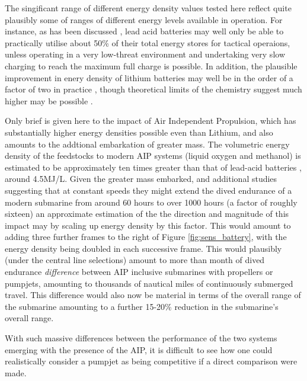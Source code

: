 \documentclass{article}\usepackage[]{graphicx}\usepackage[]{color}
\begin{document}
The singificant range of different energy density values tested here reflect quite plausibly some of ranges of different energy levels available in operation.  For instance, as has been discussed \parencite{briggs2016, greenfield2016}, lead acid batteries may well only be able to practically utilise about 50\% of their total energy stores for tactical operaions, unless operating in a very low-threat environment and undertaking very slow charging to reach the maximum full charge is possible. In addition, the plausible improvement in enery density of lithium batteries may well be in the order of a factor of two in practice \parencite{greenfield2016}, though theoretical limits of the chemistry suggest much higher may be possible \parencite{davies2016}.

Only brief is given here to the impact of Air Independent Propulsion, which has substantially higher energy densities possible even than Lithium, and also amounts to the addtional embarkation of greater mass. The volumetric energy density of the feedstocks to modern AIP systems (liquid oxygen and methanol) is estimated to be approximately ten times greater than that of lead-acid batteries \parencite{davies2016}, around 4.5MJ/L.  Given the greater mass embarked, and additional studies suggesting that at constant speeds they might extend the dived endurance of a modern submarine from around 60 hours to over 1000 hours (a factor of roughly sixteen) an approximate estimation of the the direction and magnitude of this impact may by scaling up energy density by this factor.  This would amount to adding three further frames to the right of Figure \ref{fig:sens_battery}, with the energy density being doubled in each successive frame. This would plausibly (under the central line selections) amount to more than month of dived endurance \textit{difference} between AIP inclusive submarines with propellers or pumpjets, amounting to thousands of nautical miles of continuously submerged travel.  This difference would also now be material in terms of the overall range of the submarine amounting to a further 15-20\% reduction in the submarine's overall range.

With such massive differences between the performance of the two systems emerging with the presence of the AIP, it is difficult to see how one could realistically consider a pumpjet as being competitive if a direct comparison were made.
\end{document}
